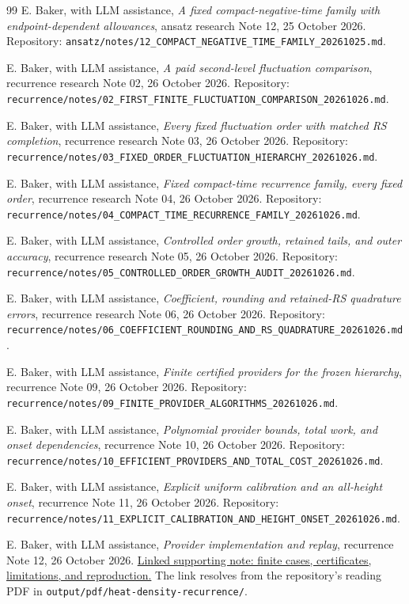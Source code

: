 \begin{thebibliography}{99}
E. Baker, with LLM assistance,
\emph{A fixed compact-negative-time family with endpoint-dependent allowances},
ansatz research Note 12, 25 October 2026.
Repository: \nolinkurl{ansatz/notes/12_COMPACT_NEGATIVE_TIME_FAMILY_20261025.md}.

E. Baker, with LLM assistance,
\emph{A paid second-level fluctuation comparison},
recurrence research Note 02, 26 October 2026.
Repository: \nolinkurl{recurrence/notes/02_FIRST_FINITE_FLUCTUATION_COMPARISON_20261026.md}.

E. Baker, with LLM assistance,
\emph{Every fixed fluctuation order with matched RS completion},
recurrence research Note 03, 26 October 2026.
Repository: \nolinkurl{recurrence/notes/03_FIXED_ORDER_FLUCTUATION_HIERARCHY_20261026.md}.

E. Baker, with LLM assistance,
\emph{Fixed compact-time recurrence family, every fixed order},
recurrence research Note 04, 26 October 2026.
Repository: \nolinkurl{recurrence/notes/04_COMPACT_TIME_RECURRENCE_FAMILY_20261026.md}.

E. Baker, with LLM assistance,
\emph{Controlled order growth, retained tails, and outer accuracy},
recurrence research Note 05, 26 October 2026.
Repository: \nolinkurl{recurrence/notes/05_CONTROLLED_ORDER_GROWTH_AUDIT_20261026.md}.

E. Baker, with LLM assistance,
\emph{Coefficient, rounding and retained-RS quadrature errors},
recurrence research Note 06, 26 October 2026.
Repository: \nolinkurl{recurrence/notes/06_COEFFICIENT_ROUNDING_AND_RS_QUADRATURE_20261026.md}.

E. Baker, with LLM assistance,
\emph{Finite certified providers for the frozen hierarchy},
recurrence Note 09, 26 October 2026.
Repository: \nolinkurl{recurrence/notes/09_FINITE_PROVIDER_ALGORITHMS_20261026.md}.

E. Baker, with LLM assistance,
\emph{Polynomial provider bounds, total work, and onset dependencies},
recurrence Note 10, 26 October 2026.
Repository: \nolinkurl{recurrence/notes/10_EFFICIENT_PROVIDERS_AND_TOTAL_COST_20261026.md}.

E. Baker, with LLM assistance,
\emph{Explicit uniform calibration and an all-height onset},
recurrence Note 11, 26 October 2026.
Repository: \nolinkurl{recurrence/notes/11_EXPLICIT_CALIBRATION_AND_HEIGHT_ONSET_20261026.md}.

E. Baker, with LLM assistance,
\emph{Provider implementation and replay}, recurrence Note 12,
26 October 2026.
\href{run:../../../papers/investigations-5/01_heat_density_asymptotics/recurrence/notes/12_PROVIDER_IMPLEMENTATION_REPLAY_20261026.md}{Linked supporting note: finite cases, certificates, limitations, and reproduction.}
The link resolves from the repository's reading PDF in
\nolinkurl{output/pdf/heat-density-recurrence/}.


\end{thebibliography}
